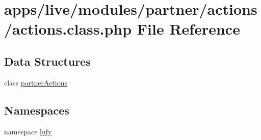 \hypertarget{live_2modules_2partner_2actions_2actions_8class_8php}{\section{apps/live/modules/partner/actions/actions.class.\-php File Reference}
\label{live_2modules_2partner_2actions_2actions_8class_8php}
}
\subsection*{Data Structures}
\begin{DoxyCompactItemize}
\item 
class \hyperlink{classpartner_actions}{partner\-Actions}
\end{DoxyCompactItemize}
\subsection*{Namespaces}
\begin{DoxyCompactItemize}
\item 
namespace \hyperlink{namespacelufy}{lufy}
\end{DoxyCompactItemize}
